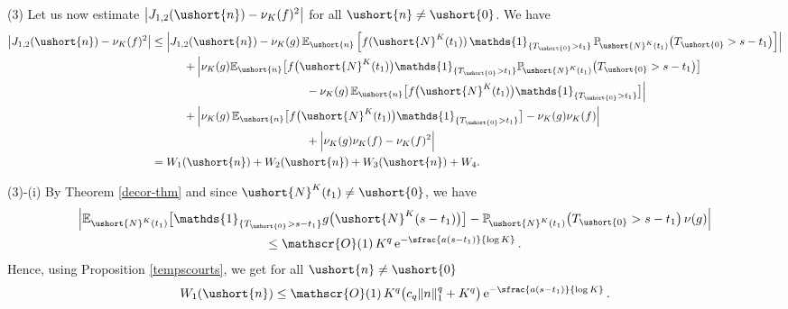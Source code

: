 \documentclass[10pt]{amsart}
\let\mathcal\mathscr
\numberwithin{equation}{section}
\theoremstyle{plain}
\theoremstyle{definition}
\newcommand{\proba}{{\mathbb{P}}}
\newcommand{\E}{{\mathbb{E}}}
\newcommand{\Oun}{\mathcal{O}(1)}
\newcommand{\un}{\mathds{1}}
\newcommand{\vecn}{\ushort{n}}
\newcommand{\veczer}{\ushort{0}}
\newcommand{\leproc}{\ushort{N}^{K}}
\newcommand{\sleproc}{\ushort{N}^{K}}
\newcommand{\nuk}{\nu_{K}}\let\snuk\nuk
\newcommand{\e}{\operatorname{e}}
\newcommand{\norm}[1]{\|#1\|_{1}}\let\snorm\norm
\begin{document}
(3)
Let us now estimate $\left| J_{1,2}(\vecn) -\nuk(f)^2\right|$ for all $\vecn\neq \veczer$.
We have
\begin{align*}
\left|J_{1,2}(\vecn) -\nuk(f)^2\right| &\leq \Bigl|J_{1,2}(\vecn)
-\nuk(g)\, \E_{\vecn}\,\Bigl[f(\leproc(t_1)) \, \un_{\{T_{\veczer} >t_1\}} \, \proba_{\!\sleproc(t_{1})}\bigl(T_{\veczer} >s-t_1\bigr)\Bigr]\Bigr|\\
& \hspace*{1cm}+ \Bigl|\nuk(g) \E_{\vecn}\bigl[f\bigl(\leproc(t_{1})\bigr)\un_{\{T_{\veczer}>t_{1}\}}
\proba_{\!\sleproc(t_{1})}\bigl(T_{\veczer}>s-t_{1}\bigr)\bigr]\\
&\hspace*{4.8cm}-\nuk(g) \,\E_{\vecn}\bigl[f\bigl(\leproc(t_{1})\bigr)\un_{\{T_{\veczer}>t_{1}\}}\bigr] \Bigr|\\
& \hspace*{1cm}+ \Bigl | \nuk(g)\,\E_{\vecn}\bigl[f\bigl(\leproc(t_{1})\bigr)
\un_{\{T_{\veczer}>t_{1}\}}\bigr]-\nuk(g)\nuk(f) \Bigr|\\
&\hspace*{4.8cm}+ \Bigl|\nuk(g)\nuk(f) - \nuk(f)^2 \Bigr|\\
&= W_{1}(\vecn)+W_{2}(\vecn)+W_{3}(\vecn)+W_{4}.
\end{align*}

(3)-(i) By Theorem \ref{decor-thm} and since $\leproc(t_1)\neq \veczer$, we have
\begin{multline*}
\Big|
\E_{\sleproc(t_{1})} \bigl[\un_{\{T_{\veczer} >s-t_1\}}g\bigl(\leproc(s-t_1)\bigr)\bigr]
- \proba_{\!\leproc(t_{1})}\bigl(T_{\veczer} >s-t_1\bigr)\, \nu(g)
\Big|\\
\leq \Oun\, K^q \e^{-\sfrac{a(s-t_{1})}{\log K}}.
\end{multline*}
Hence, using Proposition \ref{tempscourts}, we get for all $\vecn\neq \veczer$
\[
W_{1}(\vecn)\leq
\Oun \, K^q \bigl(c_q \norm{n}^{q} + K^q\bigr) \e^{- \sfrac{a(s-t_{1})}{\log K}}.
\]
\end{document}
